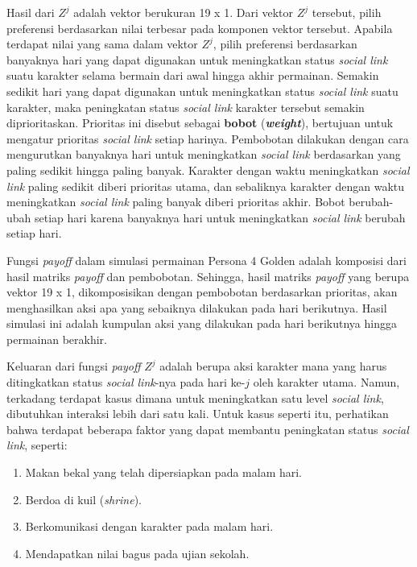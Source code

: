 Hasil dari $Z^{j}$ adalah vektor berukuran 19 x 1. Dari vektor $Z^{j}$ tersebut, pilih preferensi berdasarkan nilai terbesar pada komponen vektor tersebut. Apabila terdapat nilai yang sama dalam vektor $Z^{j}$, pilih preferensi berdasarkan banyaknya hari yang dapat digunakan untuk meningkatkan status \textit{social link} suatu karakter selama bermain dari awal hingga akhir permainan. Semakin sedikit hari yang dapat digunakan untuk meningkatkan status \textit{social link} suatu karakter, maka peningkatan status \textit{social link} karakter tersebut semakin diprioritaskan. Prioritas ini disebut sebagai \textbf{bobot} (\textit{\textbf{weight}}), bertujuan untuk mengatur prioritas \textit{social link} setiap harinya. Pembobotan dilakukan dengan cara mengurutkan banyaknya hari untuk meningkatkan \textit{social link} berdasarkan yang paling sedikit hingga paling banyak. Karakter dengan waktu meningkatkan \textit{social link} paling sedikit diberi prioritas utama, dan sebaliknya karakter dengan waktu meningkatkan \textit{social link} paling banyak diberi prioritas akhir. Bobot berubah-ubah setiap hari karena banyaknya hari untuk meningkatkan \textit{social link} berubah setiap hari.

Fungsi \textit{payoff} dalam simulasi permainan Persona 4 Golden adalah komposisi dari hasil matriks \textit{payoff} dan pembobotan. Sehingga, hasil matriks \textit{payoff} yang berupa vektor 19 x 1, dikomposisikan dengan pembobotan berdasarkan prioritas, akan menghasilkan aksi apa yang sebaiknya dilakukan pada hari berikutnya. Hasil simulasi ini adalah kumpulan aksi yang dilakukan pada hari berikutnya hingga permainan berakhir.

Keluaran dari fungsi \textit{payoff} $Z^{j}$ adalah berupa aksi karakter mana yang harus ditingkatkan status \textit{social link}-nya pada hari ke-$j$ oleh karakter utama. Namun, terkadang terdapat kasus dimana untuk meningkatkan satu level \textit{social link}, dibutuhkan interaksi lebih dari satu kali. Untuk kasus seperti itu, perhatikan bahwa terdapat beberapa faktor yang dapat membantu peningkatan status \textit{social link}, seperti:
\begin{enumerate}
    \item Makan bekal yang telah dipersiapkan pada malam hari.
    \item Berdoa di kuil (\textit{shrine}).
    \item Berkomunikasi dengan karakter pada malam hari.
    \item Mendapatkan nilai bagus pada ujian sekolah.
\end{enumerate}

